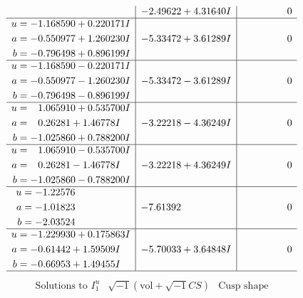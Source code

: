 \documentclass[1p]{elsarticle_modified}
\theoremstyle{definition}
\newcommand{\I}{\sqrt{-1}}
\begin{document}
$$\begin{array}{c|c|c}
 & -2.49622 + 4.31640 I & \phantom{-0.000000 } 0 \\ \hline\begin{aligned}
u &= -1.168590 + 0.220171 I \\
a &= -0.550977 + 1.260230 I \\
b &= -0.796498 + 0.896199 I\end{aligned}
 & -5.33472 + 3.61289 I & \phantom{-0.000000 } 0 \\ \hline\begin{aligned}
u &= -1.168590 - 0.220171 I \\
a &= -0.550977 - 1.260230 I \\
b &= -0.796498 - 0.896199 I\end{aligned}
 & -5.33472 - 3.61289 I & \phantom{-0.000000 } 0 \\ \hline\begin{aligned}
u &= \phantom{-}1.065910 + 0.535700 I \\
a &= \phantom{-}0.26281 + 1.46778 I \\
b &= -1.025860 + 0.788200 I\end{aligned}
 & -3.22218 - 4.36249 I & \phantom{-0.000000 } 0 \\ \hline\begin{aligned}
u &= \phantom{-}1.065910 - 0.535700 I \\
a &= \phantom{-}0.26281 - 1.46778 I \\
b &= -1.025860 - 0.788200 I\end{aligned}
 & -3.22218 + 4.36249 I & \phantom{-0.000000 } 0 \\ \hline\begin{aligned}
u &= -1.22576\phantom{ +0.000000I} \\
a &= -1.01823\phantom{ +0.000000I} \\
b &= -2.03524\phantom{ +0.000000I}\end{aligned}
 & -7.61392\phantom{ +0.000000I} & \phantom{-0.000000 } 0 \\ \hline\begin{aligned}
u &= -1.229930 + 0.175863 I \\
a &= -0.61442 + 1.59509 I \\
b &= -0.66953 + 1.49455 I\end{aligned}
 & -5.70033 + 3.64848 I & \phantom{-0.000000 } 0\\
 \hline 
 \end{array}$$\newpage$$\begin{array}{c|c|c}  
\text{Solutions to }I^u_{1}& \I (\text{vol} + \sqrt{-1}CS) & \text{Cusp shape}\\

\end{array}$$
\end{document}
